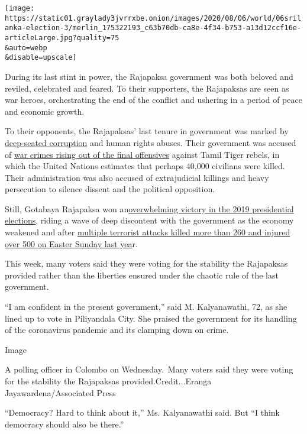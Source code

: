 \texttt{[image: https://static01.graylady3jvrrxbe.onion/images/2020/08/06/world/06srilanka-election-3/merlin\_175322193\_c63b70db-ca8e-4f34-b753-a13d12ccf16e-articleLarge.jpg?quality=75\\\&auto=webp\\\&disable=upscale]}

During its last stint in power, the Rajapaksa government was both
beloved and reviled, celebrated and feared. To their supporters, the
Rajapaksas are seen as war heroes, orchestrating the end of the conflict
and ushering in a period of peace and economic growth.

To their opponents, the Rajapaksas' last tenure in government was marked
by
\href{https://www.nytimes3xbfgragh.onion/2018/06/25/world/asia/china-sri-lanka-port.html}{deep-seated
corruption} and human rights abuses. Their government was accused of
\href{https://www.nytimes3xbfgragh.onion/2020/02/15/world/asia/sri-lanka-us-sanctions.html}{war
crimes rising out of the final offensives} against Tamil Tiger rebels,
in which the United Nations estimates that perhaps 40,000 civilians were
killed. Their administration was also accused of extrajudicial killings
and heavy persecution to silence dissent and the political opposition.

Still, Gotabaya Rajapaksa won
an\href{https://www.nytimes3xbfgragh.onion/2019/11/17/world/asia/sri-lanka-Gotabaya-Rajapaksa-election.html}{overwhelming
victory in the 2019 presidential elections}, riding a wave of deep
discontent with the government as the economy weakened and after
\href{https://www.nytimes3xbfgragh.onion/2019/04/21/world/asia/sri-lanka-bombings.html}{multiple
terrorist attacks killed more than 260 and injured over 500 on Easter
Sunday last yea}r.

This week, many voters said they were voting for the stability the
Rajapaksas provided rather than the liberties ensured under the chaotic
rule of the last government.

``I am confident in the present government,'' said M. Kalyanawathi, 72,
as she lined up to vote in Piliyandala City. She praised the government
for its handling of the coronavirus pandemic and its clamping down on
crime.

Image

A polling officer in Colombo on Wednesday.~Many voters said they were
voting for the stability the Rajapaksas provided.Credit...Eranga
Jayawardena/Associated Press

``Democracy? Hard to think about it,'' Ms. Kalyanawathi said. But ``I
think democracy should also be there.''

